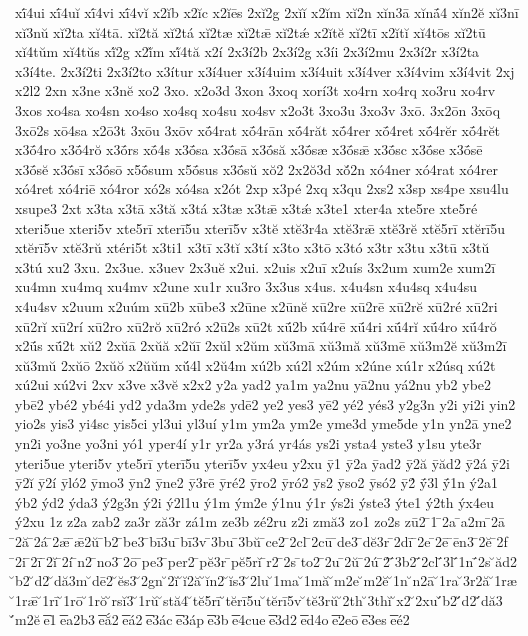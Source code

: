 {xī́4ui
xī́4uĭ
xī́4vi
xī́4vĭ
x2ĭb
x2ĭc
x2ĭēs
2xĭ2g
2xĭĭ
x2ĭm
xĭ2n
xĭn3ā
xĭnā́4
xĭn2ĕ
xĭ3nī
xĭ3nŭ
xĭ2ta
xĭ4tā.
xĭ2tă
xĭ2tá
xĭ2tæ
xĭ2tǣ
xĭ2tǽ
x2ĭtĕ
xĭ2tī
x2ĭtĭ
xĭ4tōs
xĭ2tū
xĭ4tŭm
xĭ4tŭs
xĭ́2g
x2ĭ́m
xĭ́4tă
x2í
2x3í2b
2x3í2g
x3íi
2x3í2mu
2x3í2r
x3í2ta
x3í4te.
2x3í2ti
2x3í2to
x3ítur
x3í4uer
x3í4uim
x3í4uit
x3í4ver
x3í4vim
x3í4vit
2xj
x2l2
2xn
x3ne
x3nĕ
xo2
3xo.
x2o3d
3xon
3xoq
xorí3t
xo4rn
xo4rq
xo3ru
xo4rv
3xos
xo4sa
xo4sn
xo4so
xo4sq
xo4su
xo4sv
x2o3t
3xo3u
3xo3v
3xō.
3x2ōn
3xōq
3xō2s
xō4sa
x2ō3t
3xōu
3xōv
xṓ4rat
xṓ4rān
xṓ4răt
xṓ4rer
xṓ4ret
xṓ4rĕr
xṓ4rĕt
x3ṓ4ro
x3ṓ4rŏ
x3ṓrs
xṓ4s
x3ṓsa
x3ṓsā
x3ṓsă
x3ṓsæ
x3ṓsǣ
x3ṓsc
x3ṓse
x3ṓsē
x3ṓsĕ
x3ṓsī
x3ṓsō
x5ṓsum
x5ṓsus
x3ṓsŭ
xŏ2
2x2ŏ3d
xŏ́2n
xó4ner
xó4rat
xó4rer
xó4ret
xó4riē
xó4ror
xó2s
xó4sa
x2ót
2xp
x3pé
2xq
x3qu
2xs2
x3sp
xs4pe
xsu4lu
xsupe3
2xt
x3ta
x3tā
x3tă
x3tá
x3tæ
x3tǣ
x3tǽ
x3te1
xter4a
xte5re
xte5ré
xteri5ue
xteri5v
xte5rī
xterī5u
xterī5v
x3tĕ
xtĕ3r4a
xtĕ3rǣ
xtĕ3rĕ
xtĕ5rī
xtĕrī5u
xtĕrī5v
xtĕ3rŭ
xtéri5t
x3ti1
x3tī
x3tĭ
x3tí
x3to
x3tō
x3tó
x3tr
x3tu
x3tū
x3tŭ
x3tú
xu2
3xu.
2x3ue.
x3uev
2x3uĕ
x2ui.
x2uis
x2uī
x2uís
3x2um
xum2e
xum2ī
xu4mn
xu4mq
xu4mv
x2une
xu1r
xu3ro
3x3us
x4us.
x4u4sn
x4u4sq
x4u4su
x4u4sv
x2uum
x2uúm
xū2b
xūbe3
x2ūne
x2ūnĕ
xū2re
xū2rē
xū2rĕ
xū2ré
xū2ri
xū2rĭ
xū2rí
xū2ro
xū2rŏ
xū2ró
x2ū2s
xū2t
xū́2b
xū́4rē
xū́4ri
xū́4rĭ
xū́4ro
xū́4rŏ
x2ū́s
xū́2t
xŭ2
2xŭā
2xŭă
x2ŭī
2xŭl
x2ŭm
xŭ3mā
xŭ3mă
xŭ3mē
xŭ3m2ĕ
xŭ3m2ī
xŭ3mŭ
2xŭō
2xŭŏ
x2ŭŭm
xŭ́4l
x2ŭ4́m
xú2b
xú2l
x2úm
x2úne
xú1r
x2úsq
xú2t
xú2ui
xú2vi
2xv
x3ve
x3vĕ
x2x2
y2a
yad2
ya1m
ya2nu
yā2nu
yá2nu
yb2
ybe2
ybē2
ybé2
ybé4i
yd2
yda3m
yde2s
ydē2
ye2
yes3
yē2
yé2
yés3
y2g3n
y2i
yi2i
yin2
yio2s
yis3
yi4sc
yis5ci
yl3ui
yl3uí
y1m
ym2a
ym2e
yme3d
yme5de
y1n
yn2ā
yne2
yn2i
yo3ne
yo3ni
yó1
yper4í
y1r
yr2a
y3rá
yr4ás
ys2i
ysta4
yste3
y1su
yte3r
yteri5ue
yteri5v
yte5rī
yterī5u
yterī5v
yx4eu
y2xu
ȳ1
ȳ2a
ȳad2
ȳ2ă
ȳăd2
ȳ2á
ȳ2i
ȳ2ĭ
ȳ2í
ȳló2
ȳmo3
ȳn2
ȳne2
ȳ3rē
ȳré2
ȳro2
ȳró2
ȳs2
ȳso2
ȳsó2
ȳ2́
ȳ́3l
ȳ́1n
ý2a1
ýb2
ýd2
ýda3
ý2g3n
ý2i
ý2l1u
ý1m
ým2e
ý1nu
ý1r
ýs2i
ýste3
ýte1
ý2th
ýx4eu
ý2xu
1z
z2a
zab2
za3r
ză3r
zá1m
ze3b
zé2ru
z2i
zmă3
zo1
zo2s
zū2
̄1
̄2a
̄a2m
̄2ā
̄2ă
̄2á
̄2ǣ
̄ǣ2ŭ
̄b2
̄be3
̄bī3u
̄bī3v
̄3bu
̄3bŭ
̄ce2
̄2cl
̄2cū
̄de3
̄dĕ3r
̄2dī
̄2e
̄2ē
̄ēn3
̄2ĕ
̄2f
̄2i
̄2ī
̄2ĭ
̄2í
̄n2
̄no3
̄2ō
̄pe3
̄per2
̄pĕ3r
̄pĕ5rĭ
̄r2
̄2s
̄to2
̄2u
̄2ŭ
̄2ú
̄2́
̄́3b2
̄́2cl
̄́3l
̄́1n
̄́2s
̆ăd2
̆b2
̆d2
̆dă3m
̆dē2
̆ĕs3
̆2gn
̆2ĭ
̆ĭ2ă
̆ĭn2
̆ĭs3
̆2lu
̆1ma
̆1mă
̆m2e
̆m2ĕ
̆1n
̆n2ā
̆1ra
̆3r2ă
̆1ræ
̆1rǣ
̆1rī
̆1rō
̆1rŏ
̆rsĭ3
̆1rŭ
̆stă4
̆tĕ5rī
̆tĕrī5u
̆tĕrī5v
̆tĕ3rŭ
̆2th
̆3thĭ
̆x2
̆2xu
̆́b2
̆́d2
̆́dă3
̆́m2ĕ
͞e1
͞ea2b3
͞eắ2
͞eá2
͞e3ác
͞e3áp
͞e3b
͞e4cue
͞e3d2
͞ed4o
͞e2eō
͞e3es
͞eé2
}
